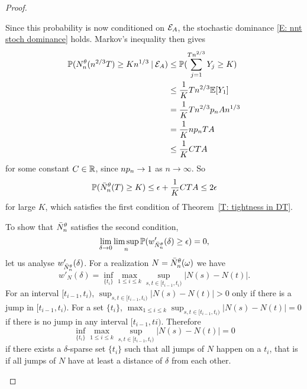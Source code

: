 \begin{proof}
\begin{proofpart}
Since this probability is now conditioned on $\mathcal{E}_{A}$, the stochastic dominance \eqref{E: nnt stoch dominance} holds.
Markov's inequality then gives
\begin{align*}
\mathbb{P}(N_n^{\theta}(n^{2 / 3}T) \geq Kn^{1 / 3} \: | \: \mathcal{E}_{A}) 
&\leq \mathbb{P}( \sum_{j=1}^{Tn^{2 / 3}} Y_j \geq K) \\
&\leq \frac{1}{K}Tn^{2 / 3} \mathbb{E}[Y_1] \\
&= \frac{1}{K}Tn^{2 / 3} p_n An^{1 / 3} \\
&= \frac{1}{K}np_n TA \\
&\leq \frac{1}{K}CTA
\end{align*}
for some constant $C \in \mathbb{R}$, since $np_n \rightarrow 1$ as $n \rightarrow \infty$.
So
\begin{equation}
\mathbb{P}(\bar{N}_n^{\theta}(T) \geq K) \leq \epsilon + \frac{1}{K}CTA \leq 2 \epsilon
\end{equation}
for large $K$, which satisfies the first condition of Theorem~\ref{T: tightness in DT}.

\bigskip

To show that $\bar{N}_n^{\theta}$ satisfies the second condition,
\begin{equation} \label{E: tightness cond 2}
\lim_{\delta \rightarrow 0} \limsup_n \mathbb{P}(w'_{\bar{N}_n^{\theta}}(\delta) \geq \epsilon ) = 0,
\end{equation}
let us analyse $w'_{\bar{N}_n^{\theta}}(\delta)$.
For a realization $N = \bar{N}_n^{\theta}(\omega)$ we have
\begin{equation}
w'_{N}(\delta) = \inf_{\{t_i\}} \max_{1\leq i \leq k} \sup_{s,t \in [t_{i-1}, t_i)} |N(s) - N(t)|.
\end{equation}
For an interval $[t_{i-1}, t_i)$, 
$\sup_{s,t \in [t_{i-1}, t_i)} |N(s) - N(t)| > 0$ only if there is a jump in $[t_{i-1}, t_i)$.
For a set $\{t_i\}$, $\max_{1\leq i \leq k} \sup_{s,t \in [t_{i-1}, t_i)} |N(s) - N(t)| = 0$ if there is no jump in any interval $[t_{i-1}, ti)$.
Therefore
\begin{equation}
\inf_{\{t_i\}} \max_{1\leq i \leq k} \sup_{s,t \in [t_{i-1}, t_i)} |N(s) - N(t)| = 0
\end{equation}
if there exists a $\delta$-sparse set $\{t_i\}$ such that all jumps of $N$ happen on a $t_i$,
that is if all jumps of $N$ have at least a distance of $\delta$ from each other.


\end{proofpart}
\end{proof}
